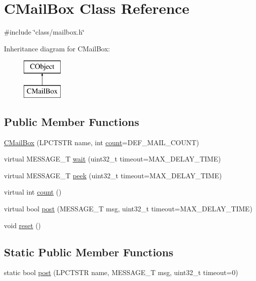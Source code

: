 \hypertarget{class_c_mail_box}{\section{C\-Mail\-Box Class Reference}
\label{class_c_mail_box}
}


{\ttfamily \#include \char`\"{}class/mailbox.\-h\char`\"{}}

Inheritance diagram for C\-Mail\-Box\-:\begin{figure}[H]
\begin{center}
\leavevmode
\includegraphics[height=2.000000cm]{d8/d26/class_c_mail_box}
\end{center}
\end{figure}
\subsection*{Public Member Functions}
\begin{DoxyCompactItemize}
\item 
\hyperlink{class_c_mail_box_a860c64ec622b6bb2641f8e69748ba9e6}{C\-Mail\-Box} (L\-P\-C\-T\-S\-T\-R name, int \hyperlink{class_c_mail_box_a11592da3e55cf9bedc8d2cf36d56e9bd}{count}=D\-E\-F\-\_\-\-M\-A\-I\-L\-\_\-\-C\-O\-U\-N\-T)
\item 
virtual M\-E\-S\-S\-A\-G\-E\-\_\-\-T \hyperlink{class_c_mail_box_ad03ed94ae07a9309d9f42695c9df7e94}{wait} (uint32\-\_\-t timeout=M\-A\-X\-\_\-\-D\-E\-L\-A\-Y\-\_\-\-T\-I\-M\-E)
\item 
virtual M\-E\-S\-S\-A\-G\-E\-\_\-\-T \hyperlink{class_c_mail_box_adc923a33209756bb2ed9e1838b12b68c}{peek} (uint32\-\_\-t timeout=M\-A\-X\-\_\-\-D\-E\-L\-A\-Y\-\_\-\-T\-I\-M\-E)
\item 
virtual int \hyperlink{class_c_mail_box_a11592da3e55cf9bedc8d2cf36d56e9bd}{count} ()
\item 
virtual bool \hyperlink{class_c_mail_box_a5ab581cd317944e824efbbc6f7f4d14d}{post} (M\-E\-S\-S\-A\-G\-E\-\_\-\-T msg, uint32\-\_\-t timeout=M\-A\-X\-\_\-\-D\-E\-L\-A\-Y\-\_\-\-T\-I\-M\-E)
\item 
void \hyperlink{class_c_mail_box_a73d5b694b1e7ce4e05c7ccc8f1dfd695}{reset} ()
\end{DoxyCompactItemize}
\subsection*{Static Public Member Functions}
\begin{DoxyCompactItemize}
\item 
static bool \hyperlink{class_c_mail_box_a96075bbd5308e6b1d0aaf5bd5fa2e645}{post} (L\-P\-C\-T\-S\-T\-R name, M\-E\-S\-S\-A\-G\-E\-\_\-\-T msg, uint32\-\_\-t timeout=0)
\end{DoxyCompactItemize}


